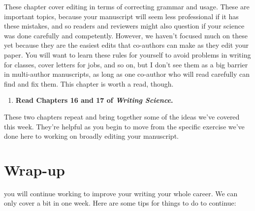 \documentclass[]{tufte-book}
\providecommand{\tightlist}{%
  \setlength{\itemsep}{0pt}\setlength{\parskip}{0pt}}
\begin{document}
These chapter cover editing in terms of correcting grammar and usage. These are
important topics, because your manuscript will seem less professional if it has
these mistakes, and so readers and reviewers might also question if your science
was done carefully and competently. However, we haven't focused much on these yet
because they are the easiest edits that co-authors can make as they edit your paper.
You will want to learn these rules for yourself to avoid problems in writing for
classes, cover letters for jobs, and so on, but I don't see them as a big barrier
in multi-author manuscripts, as long as one co-author who will read carefully can
find and fix them. This chapter is worth a read, though.

\begin{enumerate}
\def\labelenumi{\arabic{enumi}.}
\setcounter{enumi}{11}
\tightlist
\item
  \textbf{Read Chapters 16 and 17 of \emph{Writing Science}.}
\end{enumerate}

These two chapters repeat and bring together some of the ideas we've covered
this week. They're helpful as you begin to move from the specific exercise we've
done here to working on broadly editing your manuscript.

\hypertarget{wrap-up}{%
\chapter{Wrap-up}\label{wrap-up}}

 you will continue working to improve your
writing your whole career. We can only cover a bit in one week. Here are some tips for
things to do to continue:
\end{document}
